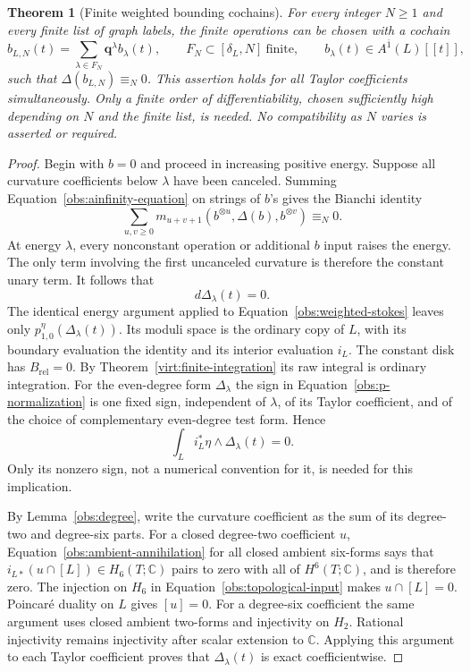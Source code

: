 \documentclass[11pt]{article}
\newtheorem{theorem}{Theorem}[section]
\theoremstyle{definition}
\theoremstyle{remark}
\numberwithin{equation}{section}
\begin{document}
\begin{theorem}[Finite weighted bounding cochains]
\label{obs:finite-bounding}
For every integer $N\ge1$ and every finite list of graph labels, the
finite operations can be chosen with a cochain
\[
 b_{L,N}(t)=\sum_{\lambda\in F_N}\mathbf q^\lambda b_\lambda(t),
 \qquad F_N\subset[\delta_L,N]\ \text{finite},\qquad
 b_\lambda(t)\in A^{\bar1}(L)[[t]],
\]
such that $\Delta(b_{L,N})\equiv_N0$.
This assertion holds for all
Taylor coefficients simultaneously.  Only a finite order of
differentiability, chosen sufficiently high depending on $N$
and the finite list, is needed.  No compatibility as $N$
varies is asserted or required.
\end{theorem}

\begin{proof}
Begin with $b=0$ and proceed in increasing positive energy.
Suppose all curvature coefficients below $\lambda$ have
been canceled.  Summing
Equation~\eqref{obs:ainfinity-equation} on strings of $b$'s
gives the Bianchi identity
\[
 \sum_{u,v\ge0}m_{u+v+1}(b^{\otimes u},\Delta(b),
                              b^{\otimes v})\equiv_N0.
\]
At energy $\lambda$, every nonconstant operation or additional
$b$ input raises the energy.  The only term involving the
first uncanceled curvature is therefore the constant unary
term.  It follows that
\begin{equation}
 \label{obs:closed-obstruction}
 d\Delta_\lambda(t)=0.
\end{equation}
The identical energy argument applied to
Equation~\eqref{obs:weighted-stokes} leaves only
$p_{1,0}^\eta(\Delta_\lambda(t))$.  Its moduli space is the
ordinary copy of $L$, with its boundary evaluation the
identity and its interior evaluation $i_L$.
The constant disk has $B_{\mathrm{rel}}=0$.
By Theorem~\ref{virt:finite-integration} its raw integral is
ordinary integration.  For the even-degree form
$\Delta_\lambda$ the sign in
Equation~\eqref{obs:p-normalization} is one fixed sign,
independent of $\lambda$, of its Taylor coefficient, and of
the choice of complementary even-degree test form.  Hence
\begin{equation}
 \label{obs:ambient-annihilation}
 \int_Li_L^*\eta\wedge\Delta_\lambda(t)=0.
\end{equation}
Only its nonzero sign, not a numerical convention for it, is
needed for this implication.

By Lemma~\ref{obs:degree}, write the curvature coefficient as
the sum of its degree-two and degree-six parts.
For a closed degree-two coefficient $u$, Equation~\eqref{obs:ambient-annihilation}
for all closed ambient six-forms says that
$i_{L*}(u\cap[L])\in H_6(T;\mathbb C)$ pairs to zero with all of
$H^6(T;\mathbb C)$, and is therefore zero.  The injection on $H_6$
in Equation~\eqref{obs:topological-input} makes $u\cap[L]=0$.
Poincar\'e duality on
$L$ gives $[u]=0$.  For a degree-six coefficient the same
argument uses closed ambient two-forms and injectivity on
$H_2$.  Rational injectivity remains injectivity after scalar
extension to $\mathbb C$.  Applying this argument to each Taylor
coefficient proves that $\Delta_\lambda(t)$ is exact
coefficientwise.


\end{proof}
\end{document}
